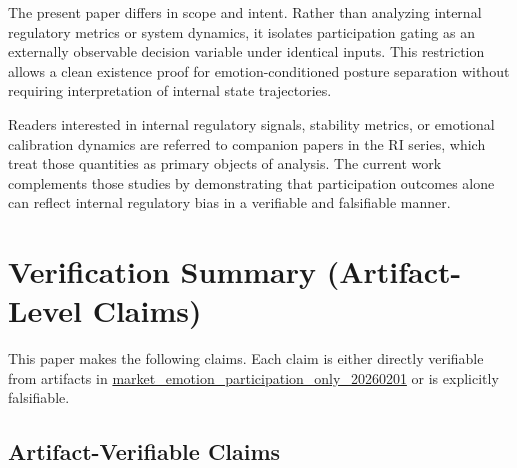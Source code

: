\documentclass[12pt,a4paper]{article}
\begin{document}
The present paper differs in scope and intent. Rather than analyzing internal regulatory
metrics or system dynamics, it isolates participation gating as an externally observable
decision variable under identical inputs. This restriction allows a clean existence proof
for emotion-conditioned posture separation without requiring interpretation of internal
state trajectories.

Readers interested in internal regulatory signals, stability metrics, or emotional
calibration dynamics are referred to companion papers in the RI series, which treat
those quantities as primary objects of analysis. The current work complements those
studies by demonstrating that participation outcomes alone can reflect internal
regulatory bias in a verifiable and falsifiable manner.

\section{Verification Summary (Artifact-Level Claims)}

This paper makes the following claims. Each claim is either directly verifiable from artifacts in \href{https://github.com/jhcragin/SpiralBrain-v3.0-public/tree/main/Emotion-Conditioned%20Risk%20Posture%20in%20Crypto%20Markets/results}{market_emotion_participation_only_20260201} or is explicitly falsifiable.

\subsection{Artifact-Verifiable Claims}
\end{document}
